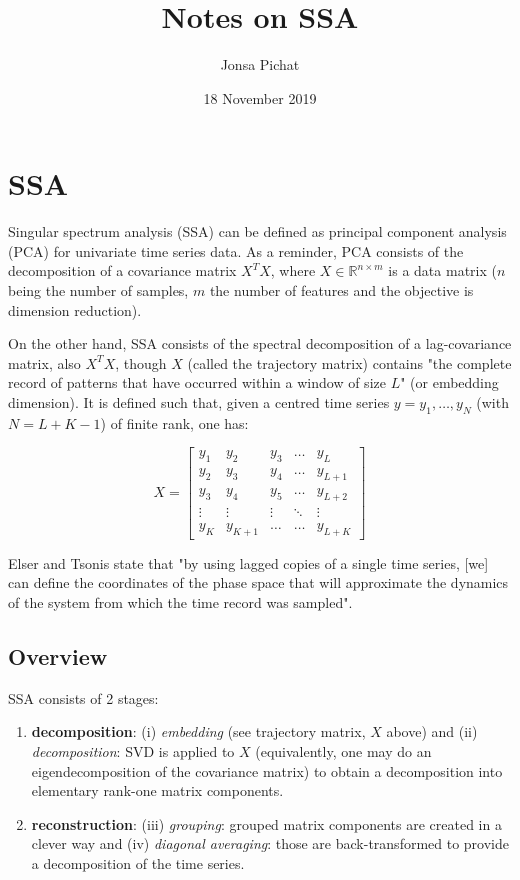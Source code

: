 \documentclass{article}
\begin{document}
\title{Notes on SSA}
\author{Jonsa Pichat}
\date{18 November 2019}
\maketitle


\section{SSA}
\label{ssa}

Singular spectrum analysis (SSA) can be defined as principal component analysis (PCA) for univariate time series data. As a reminder, PCA consists of the decomposition of a covariance matrix $X^TX$, where $X\in\mathbb{R}^{n\times m}$ is a data matrix ($n$ being the number of samples, $m$ the number of features and the objective is dimension reduction). 

On the other hand, SSA consists of the spectral decomposition of a lag-covariance matrix, also $X^TX$, though $X$ (called the trajectory matrix) contains "the complete record of patterns that have occurred within a window of size $L$" (or embedding dimension). It is defined such that, given a centred time series $y=y_1, \dots, y_N$ (with $N=L+K-1$) of finite rank, one has:

\[X=
  \begin{bmatrix} 
    y_{1} & y_{2} & y_{3} & \dots  & y_{L} \\
    y_{2} & y_{3} & y_{4} & \dots  & y_{L+1} \\
    y_{3} & y_{4} & y_{5} & \dots  & y_{L+2} \\
    \vdots & \vdots & \vdots & \ddots & \vdots \\
    y_{K} & y_{K+1} & \dots & \dots  & y_{L+K}
\end{bmatrix}
\]


Elser and Tsonis state that "by using lagged copies of a single time series, [we] can define the coordinates of the phase space that will approximate the dynamics of the system from which the time record was sampled".\\


\subsection{Overview}


SSA consists of 2 stages:
\begin{enumerate}
  \item \textbf{decomposition}: (i) \textit{embedding} (see trajectory matrix, $X$ above) and (ii) \textit{decomposition}: SVD is applied to $X$ (equivalently, one may do an eigendecomposition of the covariance matrix) to obtain a decomposition into elementary rank-one matrix components.
  \item \textbf{reconstruction}: (iii) \textit{grouping}: grouped matrix components are created in a clever way and (iv) \textit{diagonal averaging}: those are back-transformed to provide a decomposition of the time series.
\end{enumerate}
\end{document}

